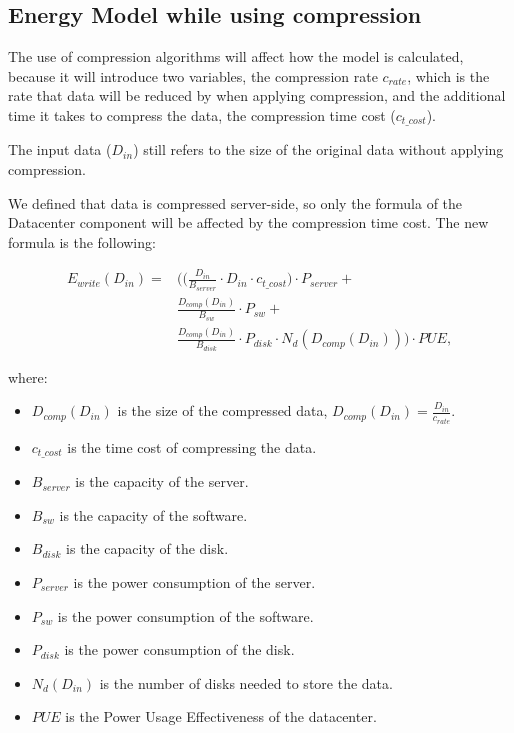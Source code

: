 \subsection{Energy Model while using compression}

    The use of compression algorithms will affect how the model is calculated, because it will introduce two variables, the compression rate $c_{rate}$, which is the rate that data will be reduced by when applying compression, and the additional time it takes to compress the data, the compression time cost ($c_{t\_cost}$).

    The input data ($D_{in}$) still refers to the size of the original data without applying compression.

    We defined that data is compressed server-side, so only the formula of the Datacenter component will be affected by the compression time cost. The new formula is the following:
    
    \begin{equation}
    \label{formula:upload_server_write_compressed}
    \begin{split}
        E_{write}(D_{in}) = & \Bigg( \bigg(\frac{D_{in}}{B_{server}} \cdot D_{in} \cdot c_{t\_cost} \bigg) \cdot P_{server} + \\ & \frac{D_{comp}(D_{in})}{B_{sw}} \cdot P_{sw} + \\ & \frac{D_{comp}(D_{in})}{B_{disk}} \cdot P_{disk} \cdot N_d(D_{comp}(D_{in})) \Bigg) \cdot PUE,
    \end{split}
    \end{equation}

    \noindent where:
    \begin{itemize}
        \item $D_{comp}(D_{in})$ is the size of the compressed data, $D_{comp}(D_{in}) = \frac{D_{in}}{c_{rate}}$.
        \item $c_{t\_cost}$ is the time cost of compressing the data.
        \item $B_{server}$ is the capacity of the server.
        \item $B_{sw}$ is the capacity of the software.
        \item $B_{disk}$ is the capacity of the disk.
        \item $P_{server}$ is the power consumption of the server.
        \item $P_{sw}$ is the power consumption of the software.
        \item $P_{disk}$ is the power consumption of the disk.
        \item $N_d(D_{in})$ is the number of disks needed to store the data.
        \item $PUE$ is the Power Usage Effectiveness of the datacenter.
    \end{itemize}

